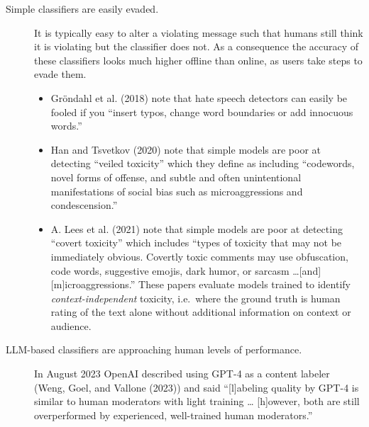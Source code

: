 \documentclass[
  10pt,
  ignorenonframetext,
]{beamer}
\providecommand{\tightlist}{%
  \setlength{\itemsep}{0pt}\setlength{\parskip}{0pt}}\usepackage{longtable,booktabs,array}
\begin{document}
\begin{frame}{}
\label{section-1}
\begin{description}
\item[Simple classifiers are easily evaded.]
It is typically easy to alter a violating message such that humans still
think it is violating but the classifier does not. As a consequence the
accuracy of these classifiers looks much higher offline than online, as
users take steps to evade them.

\begin{itemize}
\tightlist
\item
  Gröndahl et al. (2018) note that hate speech detectors can easily be
  fooled if you ``insert typos, change word boundaries or add innocuous
  words.''
\item
  Han and Tsvetkov (2020) note that simple models are poor at detecting
  ``veiled toxicity'' which they define as including ``codewords, novel
  forms of offense, and subtle and often unintentional manifestations of
  social bias such as microaggressions and condescension.''
\item
  A. Lees et al. (2021) note that simple models are poor at detecting
  ``covert toxicity'' which includes ``types of toxicity that may not be
  immediately obvious. Covertly toxic comments may use obfuscation, code
  words, suggestive emojis, dark humor, or sarcasm \ldots{[}and{]}
  {[}m{]}icroaggressions.'' These papers evaluate models trained to
  identify \emph{context-independent} toxicity, i.e.~where the ground
  truth is human rating of the text alone without additional information
  on context or audience.
\end{itemize}
\item[LLM-based classifiers are approaching human levels of
performance.]
In August 2023 OpenAI described using GPT-4 as a content labeler (Weng,
Goel, and Vallone (2023)) and said ``{[}l{]}abeling quality by GPT-4 is
similar to human moderators with light training \ldots{} {[}h{]}owever,
both are still overperformed by experienced, well-trained human
moderators.''
\end{description}
\end{frame}
\end{document}
